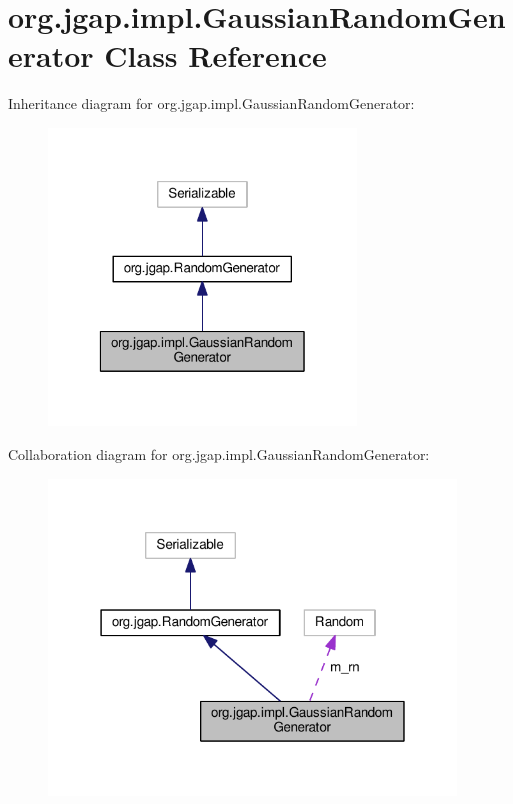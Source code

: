 \hypertarget{classorg_1_1jgap_1_1impl_1_1_gaussian_random_generator}{\section{org.\-jgap.\-impl.\-Gaussian\-Random\-Generator Class Reference}
\label{classorg_1_1jgap_1_1impl_1_1_gaussian_random_generator}
}


Inheritance diagram for org.\-jgap.\-impl.\-Gaussian\-Random\-Generator\-:
\nopagebreak
\begin{figure}[H]
\begin{center}
\leavevmode
\includegraphics[width=232pt]{classorg_1_1jgap_1_1impl_1_1_gaussian_random_generator__inherit__graph}
\end{center}
\end{figure}


Collaboration diagram for org.\-jgap.\-impl.\-Gaussian\-Random\-Generator\-:
\nopagebreak
\begin{figure}[H]
\begin{center}
\leavevmode
\includegraphics[width=307pt]{classorg_1_1jgap_1_1impl_1_1_gaussian_random_generator__coll__graph}
\end{center}
\end{figure}
